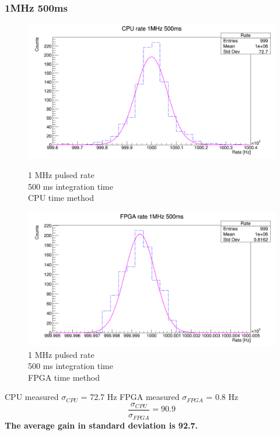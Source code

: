 \subsubsection{1MHz 500ms}
\begin{figure}[H]
	\centering
	\begin{minipage}{0.49\textwidth}
		\centering
		\includegraphics[width=.99\linewidth]{IMG/ch5/RateMeasures/CPU-time-rate-1MHz-500ms}
		\caption{1 MHz pulsed rate\\500 ms integration time\\CPU time method}
		\label{fig:CPU-time-rate-1MHz-500ms}
	\end{minipage}%
	\begin{minipage}{0.49\textwidth}
		\centering
		\includegraphics[width=.99\linewidth]{IMG/ch5/RateMeasures/FPGA-time-rate-1MHz-500ms}
		\caption{1 MHz pulsed rate\\500 ms integration time\\FPGA time method}
		\label{fig:FPGA-time-rate-1MHz-500ms}
	\end{minipage}
\end{figure}
\noindent CPU measured $\sigma_{CPU}$ = 72.7 Hz
\newline
FPGA measured $\sigma_{FPGA}$ = 0.8 Hz
\begin{equation}
	\frac{\sigma_{CPU}}{\sigma_{FPGA}} = 90.9
\end{equation}
\newline
\noindent \textbf{The average gain in standard deviation is 92.7.}
